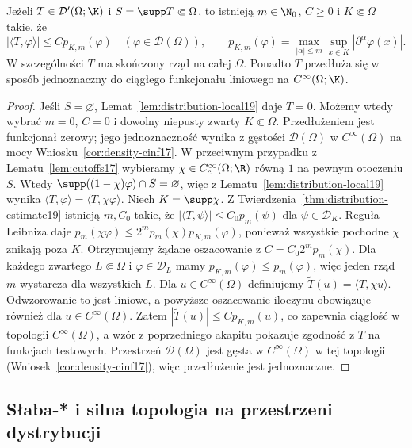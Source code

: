 \begin{twierdzenie}
\label{thm:compact-support-order19}
Jeżeli $T\in\mathcal D'(\Omega;\K)$ i
$S=\supp T\Subset\Omega$, to istnieją
$m\in\N_0$, $C\ge0$ i $K\Subset\Omega$ takie, że
\[|\langle T,\varphi\rangle|\le C p_{K,m}(\varphi)
\quad(\varphi\in\mathcal D(\Omega)),\qquad
p_{K,m}(\varphi)=\max_{|\alpha|\le m}
\sup_{x\in K}|\partial^\alpha\varphi(x)|.\]
W szczególności $T$ ma skończony rząd na całej $\Omega$.
Ponadto $T$ przedłuża się w sposób jednoznaczny do
ciągłego funkcjonału liniowego na $C^\infty(\Omega;\K)$.
\end{twierdzenie}
\begin{proof}
Jeśli $S=\varnothing$, Lemat~\ref{lem:distribution-local19}
daje $T=0$. Możemy wtedy wybrać $m=0$, $C=0$
i dowolny niepusty zwarty $K\Subset\Omega$.
Przedłużeniem jest funkcjonał zerowy; jego jednoznaczność
wynika z gęstości $\mathcal D(\Omega)$ w $C^\infty(\Omega)$
na mocy Wniosku~\ref{cor:density-cinf17}.
W przeciwnym przypadku z Lematu~\ref{lem:cutoffs17}
wybieramy $\chi\in C_c^\infty(\Omega;\R)$ równą $1$
na pewnym otoczeniu $S$. Wtedy
$\supp((1-\chi)\varphi)\cap S=\varnothing$, więc z
Lematu~\ref{lem:distribution-local19} wynika
$\langle T,\varphi\rangle=\langle T,\chi\varphi\rangle$.
Niech $K=\supp\chi$. Z Twierdzenia~\ref{thm:distribution-estimate19}
istnieją $m,C_0$ takie, że
$|\langle T,\psi\rangle|\le C_0p_m(\psi)$ dla
$\psi\in\mathcal D_K$. Reguła Leibniza daje
$p_m(\chi\varphi)\le 2^m p_m(\chi)p_{K,m}(\varphi)$,
ponieważ wszystkie pochodne $\chi$ znikają poza $K$.
Otrzymujemy żądane oszacowanie z $C=C_0 2^m p_m(\chi)$.
Dla każdego zwartego $L\Subset\Omega$ i $\varphi\in\mathcal D_L$
mamy $p_{K,m}(\varphi)\le p_m(\varphi)$,
więc jeden rząd $m$ wystarcza dla wszystkich $L$.
Dla $u\in C^\infty(\Omega)$ definiujemy
$\widetilde T(u)=\langle T,\chi u\rangle$.
Odwzorowanie to jest liniowe, a powyższe oszacowanie
iloczynu obowiązuje również dla $u\in C^\infty(\Omega)$.
Zatem $|\widetilde T(u)|\le C p_{K,m}(u)$,
co zapewnia ciągłość w topologii $C^\infty(\Omega)$, a wzór z poprzedniego akapitu
pokazuje zgodność z $T$ na funkcjach testowych.
Przestrzeń $\mathcal D(\Omega)$ jest gęsta w
$C^\infty(\Omega)$ w tej topologii (Wniosek~\ref{cor:density-cinf17}),
więc przedłużenie jest jednoznaczne.
\end{proof}

\subsection{Słaba-* i silna topologia na przestrzeni dystrybucji}

